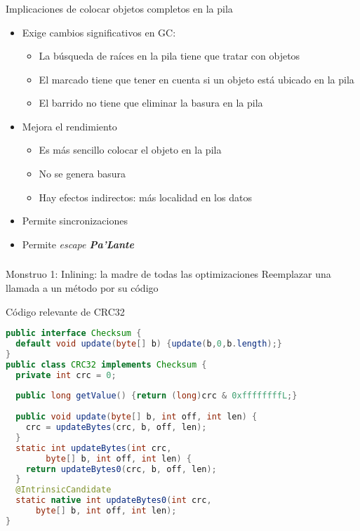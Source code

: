 \begin{frame}[fragile]
  \frametitle{\ft}
  \begin{block}{Implicaciones de colocar objetos completos en la pila}
    \begin{itemize}
    \item Exige cambios significativos en GC:
      \begin{itemize}
      \item La búsqueda de raíces en la pila tiene que tratar con objetos
      \item El marcado tiene que tener en cuenta si un objeto está ubicado
        en la pila
      \item El barrido no tiene que eliminar la basura en la pila
      \end{itemize}
    \item Mejora el rendimiento
      \begin{itemize}
      \item Es más sencillo colocar el objeto en la pila
      \item No se genera basura
      \item Hay efectos indirectos: más localidad en los datos
      \end{itemize}
    \item Permite sincronizaciones
    \item Permite {\it escape {\bfseries Pa'Lante}}
    \end{itemize}
  \end{block}
\end{frame}


\begin{frame}[fragile]
  \frametitle{\ft}
  \begin{block}{Monstruo 1: Inlining: la madre de todas las optimizaciones}
    Reemplazar una llamada a un método por su código
  \end{block}
\end{frame}

\begin{frame}[fragile]
  \begin{block}{Código relevante de CRC32}
    \begin{lstlisting}[language=java]
public interface Checksum {
  default void update(byte[] b) {update(b,0,b.length);}
}
public class CRC32 implements Checksum {
  private int crc = 0;
  
  public long getValue() {return (long)crc & 0xffffffffL;}
  
  public void update(byte[] b, int off, int len) {
    crc = updateBytes(crc, b, off, len);
  }
  static int updateBytes(int crc,
        byte[] b, int off, int len) {
    return updateBytes0(crc, b, off, len);
  }
  @IntrinsicCandidate
  static native int updateBytes0(int crc,
      byte[] b, int off, int len);
}
    \end{lstlisting}
  \end{block}
\end{frame}


